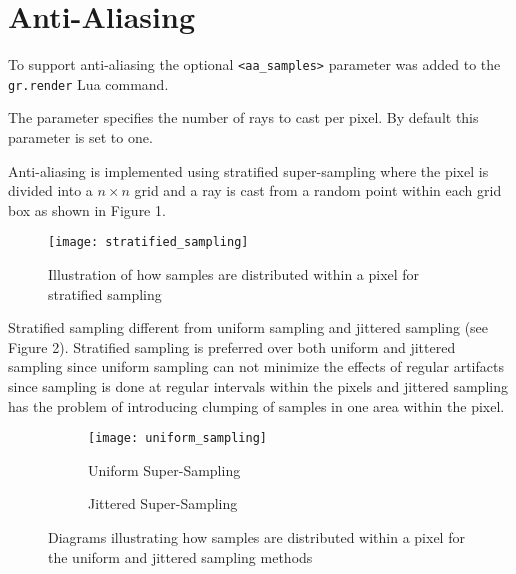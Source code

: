 \section{Anti-Aliasing}

To support anti-aliasing the optional \verb|<aa_samples>| parameter was added to
the \verb|gr.render| Lua command.

The parameter specifies the number of rays to cast per pixel. By default this
parameter is set to one.

Anti-aliasing is implemented using stratified super-sampling where the pixel is
divided into a $n\times n$ grid and a ray is cast from a random point within 
each grid box as shown in Figure 1.

\begin{figure}[h]
\texttt{[image: stratified\_sampling]}
\caption{Illustration of how samples are distributed within a pixel for
stratified sampling}
\label{fig:image1}
\end{figure}

Stratified sampling different from uniform sampling and jittered 
sampling (see Figure 2). Stratified sampling is preferred over both uniform and
jittered sampling since uniform sampling can not minimize the effects of regular 
artifacts since sampling is done at regular intervals within the pixels and
jittered sampling has the problem of introducing clumping of samples in one area
within the pixel.

\begin{figure}[h]
\begin{subfigure}{0.5\textwidth}
  \texttt{[image: uniform\_sampling]}
  \caption{Uniform Super-Sampling}
  \label{fig:subim1}
\end{subfigure}
\begin{subfigure}
  \texttt{[image: jittered\_sampling]}
  \caption{Jittered Super-Sampling}
  \label{fig:subim2}
\end{subfigure}
\caption{Diagrams illustrating how samples are distributed within a pixel for
the uniform and jittered sampling methods}
\label{fig:image2}
\end{figure}


